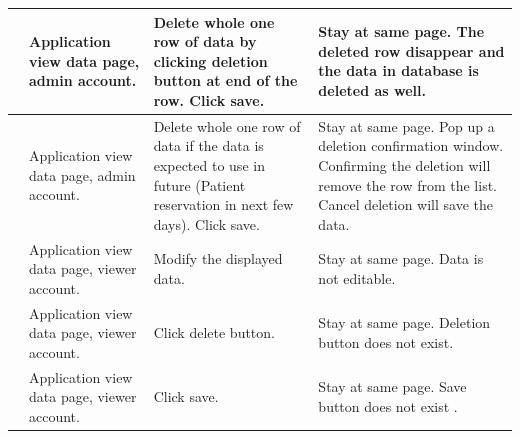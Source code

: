 \documentclass[12pt]{article}
\newcounter{TestCounter}
\begin{document}
\begin{center}
\begin{longtable}{c>{\raggedright\arraybackslash}p{4.8cm} >{\raggedright\arraybackslash}p{3cm}>{\raggedright\arraybackslash}p{3cm}}
		\\\midrule
		\stepcounter{TestCounter}\arabic{TestCounter} 
		& Application view data page, admin account.
		& Delete whole one row of data by clicking deletion button at end of the row. Click save. 
		& Stay at same page. The deleted row disappear and the data in database is deleted as well.
		\\\midrule
		\stepcounter{TestCounter}\arabic{TestCounter} 
		& Application view data page, admin account.
		& Delete whole one row of data if the data is expected to use in future (Patient reservation in next few days). Click save.
		& Stay at same page. Pop up a deletion confirmation window. Confirming  the deletion will remove the row from the list. Cancel deletion will save the data.
		\\\midrule
		\stepcounter{TestCounter}\arabic{TestCounter} 
		& Application view data page, viewer account.
		& Modify the displayed data. 
		& Stay at same page. Data is not editable.
		\\\midrule
		\stepcounter{TestCounter}\arabic{TestCounter} 
		& Application view data page, viewer account.
		& Click delete button.
		& Stay at same page. Deletion button does not exist.
		\\\midrule
		\stepcounter{TestCounter}\arabic{TestCounter} 
		& Application view data page, viewer account.
		& Click save.
		& Stay at same page.
		Save button does not exist .
		\\\midrule		
		\bottomrule
	\end{longtable}
\end{center}
\end{document}
